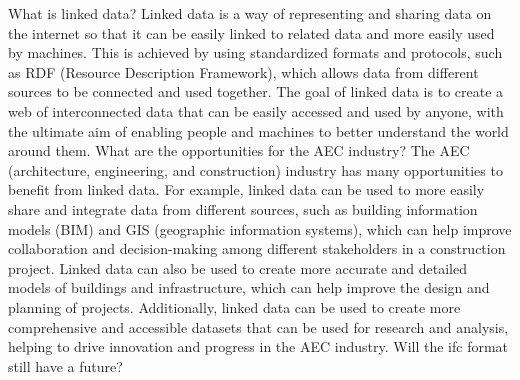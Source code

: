 \scene[]
\begin{drama}
\mespeaks What is linked data?
\gptspeaks Linked data is a way of representing and sharing data on the internet so that it can be easily linked to related data and more easily used by machines. This is achieved by using standardized formats and protocols, such as RDF (Resource Description Framework), which allows data from different sources to be connected and used together. The goal of linked data is to create a web of interconnected data that can be easily accessed and used by anyone, with the ultimate aim of enabling people and machines to better understand the world around them.
\mespeaks What are the opportunities for the AEC industry?
The AEC (architecture, engineering, and construction) industry has many opportunities to benefit from linked data. For example, linked data can be used to more easily share and integrate data from different sources, such as building information models (BIM) and GIS (geographic information systems), which can help improve collaboration and decision-making among different stakeholders in a construction project. Linked data can also be used to create more accurate and detailed models of buildings and infrastructure, which can help improve the design and planning of projects. Additionally, linked data can be used to create more comprehensive and accessible datasets that can be used for research and analysis, helping to drive innovation and progress in the AEC industry.
\mespeaks Will the ifc format still have a future?

\end{drama}
